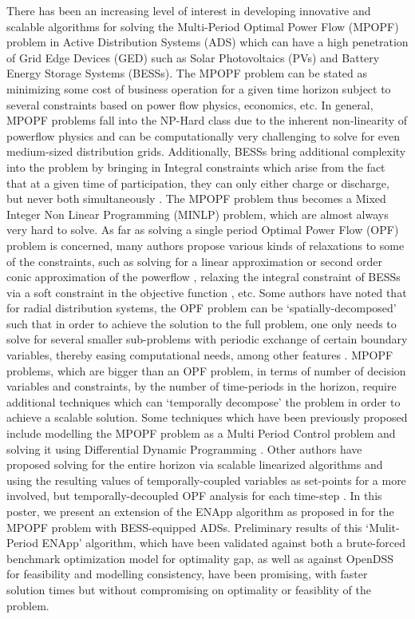 \documentclass[conference]{IEEEtran} %
\begin{document}
There has been an increasing level of interest in developing innovative and scalable algorithms for solving the Multi-Period Optimal Power Flow (MPOPF) problem in Active Distribution Systems (ADS) which can have a high penetration of Grid Edge Devices (GED) such as Solar Photovoltaics (PVs) and Battery Energy Storage Systems (BESSs). The MPOPF problem can be stated as minimizing some cost of business operation for a given time horizon subject to several constraints based on power flow physics, economics, etc. In general, MPOPF problems fall into the NP-Hard class \cite{Lehmann2015Mar} due to the inherent non-linearity of powerflow physics \cite{bfm01} and can be computationally very challenging to solve for even medium-sized distribution grids. Additionally, BESSs bring additional complexity into the problem by bringing in Integral constraints which arise from the fact that at a given time of participation, they can only either charge or discharge, but never both simultaneously \cite{Nazir2021Sep}. The MPOPF problem thus becomes a Mixed Integer Non Linear Programming (MINLP) problem, which are almost always very hard to solve. As far as solving a single period Optimal Power Flow (OPF) problem is concerned, many authors propose various kinds of relaxations to some of the constraints, such as solving for a linear approximation or second order conic approximation of the powerflow \cite{Baran1989Apr, Gan, Farivar, Nazir2018Jun}, relaxing the integral constraint of BESSs via a soft constraint in the objective function \cite{Nazir2018Jun, ddp_sugar_01}, etc. Some authors have noted that for radial distribution systems, the OPF problem can be `spatially-decomposed' such that in order to achieve the solution to the full problem, one only needs to solve for several smaller sub-problems with periodic exchange of certain boundary variables, thereby easing computational needs, among other features \cite{Sadnan}. MPOPF problems, which are bigger than an OPF problem, in terms of number of decision variables and constraints, by the number of time-periods in the horizon, require additional techniques which can `temporally decompose' the problem in order to achieve a scalable solution. Some techniques which have been previously proposed include modelling the MPOPF problem as a Multi Period Control problem and solving it using Differential Dynamic Programming \cite{ddp_sugar_01}. Other authors have proposed solving for the entire horizon via scalable linearized algorithms and using the resulting values of temporally-coupled variables as set-points for a more involved, but temporally-decoupled OPF analysis for each time-step \cite{Nazir2018Jun, Nazir2019Jun}.
In this poster, we present an extension of the ENApp algorithm as proposed in \cite{Sadnan} for the MPOPF problem with BESS-equipped ADSs. Preliminary results of this `Mulit-Period ENApp' algorithm, which have been validated against both a brute-forced benchmark optimization model for optimality gap, as well as against OpenDSS for feasibility and modelling consistency, have been promising, with faster solution times but without compromising on optimality or feasiblity of the problem. 



\end{document}
